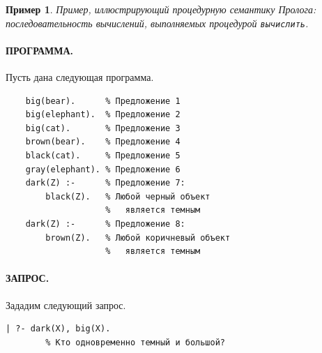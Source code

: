 \documentclass[12pt, openany, twoside]{book} %
\newtheorem{example}{Пример}[chapter]
\begin{document}
\begin{example}\label{ex:bear}
Пример, иллюстрирующий процедурную семантику Пролога: последовательность вычислений, выполняемых процедурой {\tt вычислить}.
\end{example}
\paragraph{ПРОГРАММА.} Пусть дана следующая программа.
{\tt\begin{verbatim}
    big(bear).      % Предложение 1
    big(elephant).  % Предложение 2
    big(cat).       % Предложение 3
    brown(bear).    % Предложение 4
    black(cat).     % Предложение 5
    gray(elephant). % Предложение 6
    dark(Z) :-      % Предложение 7:
        black(Z).   % Любой черный объект
                    %   является темным
    dark(Z) :-      % Предложение 8:
        brown(Z).   % Любой коричневый объект
                    %   является темным
\end{verbatim}}

\paragraph{ЗАПРОС.} Зададим следующий запрос.
{\tt\begin{verbatim}
| ?- dark(X), big(X).
        % Кто одновременно темный и большой?
\end{verbatim}}
\end{document}
